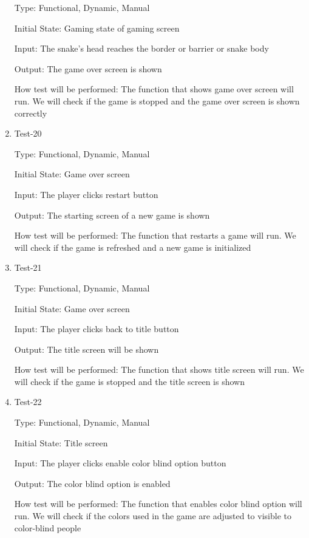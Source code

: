 \documentclass[12pt, titlepage]{article}
\begin{document}
\begin{enumerate}
Type: Functional, Dynamic, Manual

Initial State: Gaming state of gaming screen

Input: The snake's head reaches the border or barrier or snake body

Output: The game over screen is shown

How test will be performed: The function that shows game over screen will run. We will check if the game is stopped and the game over screen is shown correctly

\item{Test-20\\}

Type: Functional, Dynamic, Manual

Initial State: Game over screen

Input: The player clicks restart button

Output: The starting screen of a new game is shown

How test will be performed: The function that restarts a game will run. We will check if the game is refreshed and a new game is initialized

\item{Test-21\\}

Type: Functional, Dynamic, Manual

Initial State: Game over screen

Input: The player clicks back to title button

Output: The title screen will be shown

How test will be performed: The function that shows title screen will run. We will check if the game is stopped and the title screen is shown

\item{Test-22\\}

Type: Functional, Dynamic, Manual

Initial State: Title screen

Input: The player clicks enable color blind option button

Output: The color blind option is enabled

How test will be performed: The function that enables color blind option will run. We will check if the colors used in the game are adjusted to visible to color-blind people

\end{enumerate}
\end{document}
